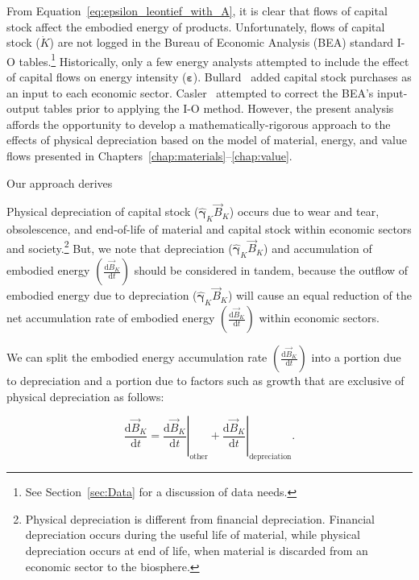 From Equation~\ref{eq:epsilon_leontief_with_A},
it is clear that flows of capital stock affect
the embodied energy of products.
Unfortunately, flows of capital stock ($\dot{K}$) are not logged in the 
Bureau of Economic Analysis (BEA) standard I-O tables.\footnote{See
Section~\ref{sec:Data} for a discussion of data needs.}
Historically, only a few energy analysts attempted to include the effect
of capital flows on energy intensity ($\boldsymbol{\varepsilon}$). 
Bullard~\cite{Bullard1975} added capital stock purchases as an input
to each economic sector.
Casler~\cite{Casler:1983uy} attempted to correct the BEA's
input-output tables prior to applying the I-O method.
However, the present analysis affords the opportunity
to develop a mathematically-rigorous approach to the 
effects of physical depreciation based on 
the model of material, energy, and value flows presented 
in Chapters~\ref{chap:materials}--\ref{chap:value}.

Our approach derives




Physical depreciation 
of capital stock ($\hat{\boldsymbol{\gamma}}_{K}\vec{B}_{K}$)
occurs due to wear and tear, obsolescence, and end-of-life
of material and capital stock 
within economic sectors and society.\footnote{Physical depreciation
is different from financial depreciation. 
Financial depreciation occurs during the useful life of material, 
while physical depreciation occurs at end of life, 
when material is discarded from an economic sector to the biosphere.}
But, we note that depreciation ($\hat{\boldsymbol{\gamma}}_{K} \vec{B}_{K}$) 
and accumulation of embodied energy 
$\left( \frac{\mathrm{d}\vec{B}_{K}}{\mathrm{d}t} \right)$
should be considered in tandem,
because the outflow of embodied energy due to depreciation
($\hat{\boldsymbol{\gamma}}_{K} \vec{B}_{K}$)
will cause an equal reduction of the net accumulation rate of embodied energy
$\left( \frac{\mathrm{d}\vec{B}_{K}}{\mathrm{d}t} \right)$
within economic sectors.

We can split the embodied energy accumulation rate 
$\left( \frac{\mathrm{d}\vec{B}_{K}}{\mathrm{d}t} \right)$
into a portion due to depreciation and a portion due to 
factors such as growth that are exclusive of physical depreciation as follows:

\begin{equation} \label{eq:dB_dt_split}
	\frac{\mathrm{d}\vec{B}_{K}}{\mathrm{d}t} 
	= \left. \frac{\mathrm{d}\vec{B}_{K}}{\mathrm{d}t} \right|_{\mathrm{other}} 
	+ \left. \frac{\mathrm{d}\vec{B}_{K}}{\mathrm{d}t} \right|_{\mathrm{depreciation}}.
\end{equation}

